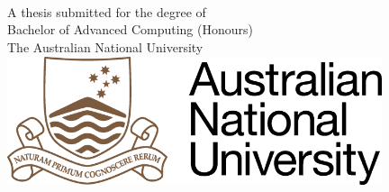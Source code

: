 \begin{titlepage}
  \enlargethispage{2cm}
  \begin{center}
    \makeatletter
    \Huge\textbf{\@title} \\[2.5cm]
    \huge{\@author} \\[3.5cm]
    \makeatother
    \thismonth\\[2cm]
    \large{A thesis submitted for the degree of \\
    Bachelor of Advanced Computing (Honours) \\
    The Australian National University} \\[2cm]
    \includegraphics[width=11cm]{figs/title/cropped-Australian-National-University-Logo.png}
  \end{center}
\end{titlepage}
